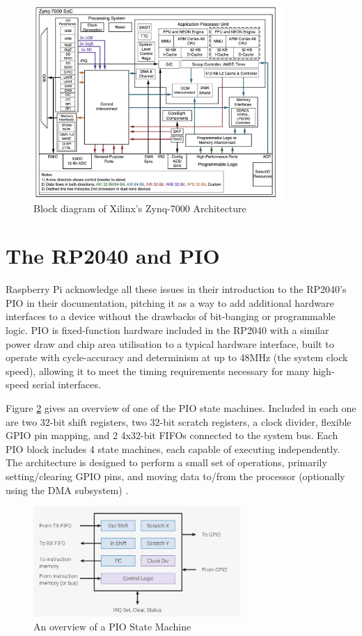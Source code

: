 \begin{figure}[H]
    \centering
    \includegraphics[width=0.85\textwidth]{../img/zynq.png}
    \caption{Block diagram of Xilinx's Zynq-7000 Architecture \cite{zynq}}
    \label{fig:zynq}
\end{figure}


\section{The RP2040 and PIO}
Raspberry Pi acknowledge all these issues in their introduction to the RP2040's PIO in their documentation, pitching it as a way to add additional hardware interfaces to a device without the drawbacks of bit-banging or programmable logic. PIO is fixed-function hardware included in the RP2040 with a similar power draw and chip area utilisation to a typical hardware interface, built to operate with cycle-accuracy and determinism at up to 48MHz (the system clock speed), allowing it to meet the timing requirements necessary for many high-speed serial interfaces.

Figure \ref{fig:pio-sm} gives an overview of one of the PIO state machines. Included in each one are two 32-bit shift registers, two 32-bit scratch registers, a clock divider, flexible GPIO pin mapping, and 2 4x32-bit FIFOs connected to the system bus. Each PIO block includes 4 state machines, each capable of executing independently. The architecture is designed to perform a small set of operations, primarily setting/clearing GPIO pins, and moving data to/from the processor (optionally using the DMA subsystem) \cite{rp2040}.

\begin{figure}[H]
    \centering
    \includegraphics[width=0.7\textwidth]{../img/rp2040-state-machine.png}
    \caption{An overview of a PIO State Machine \citep{rp2040}}
    \label{fig:pio-sm}
\end{figure}

